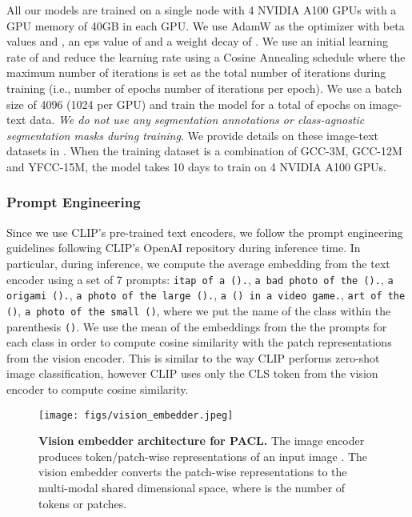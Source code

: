 \documentclass[10pt,twocolumn,letterpaper]{article}
\begin{document}
All our models are trained on a single node with 4 NVIDIA A100 GPUs with a GPU memory of 40GB in each GPU. We use AdamW as the optimizer with beta values  and , an eps value of  and a weight decay of . We use an initial learning rate of  and reduce the learning rate using a Cosine Annealing schedule where the maximum number of iterations is set as the total number of iterations during training (i.e., number of epochs  number of iterations per epoch). We use a batch size of 4096 (1024 per GPU) and train the model for a total of  epochs on image-text data. \emph{We do not use any segmentation annotations or class-agnostic segmentation masks during training}. We provide details on these image-text datasets in . When the training dataset is a combination of GCC-3M, GCC-12M and YFCC-15M, the model takes 10 days to train on 4 NVIDIA A100 GPUs.

\subsubsection{Prompt Engineering}
\label{app:prompt_engg}

Since we use CLIP's \cite{radford2021learning} pre-trained text encoders, we follow the prompt engineering guidelines following CLIP's OpenAI repository during inference time. In particular, during inference, we compute the average embedding from the text encoder using a set of 7 prompts: \texttt{itap of a ().}, \texttt{a bad photo of the ().}, \texttt{a origami ().}, \texttt{a photo of the large ().}, \texttt{a () in a video game.}, \texttt{art of the ()}, \texttt{a photo of the small ()}, where we put the name of the class within the parenthesis \texttt{()}. We use the mean of the embeddings from the the prompts for each class in order to compute cosine similarity with the patch representations from the vision encoder. This is similar to the way CLIP performs zero-shot image classification, however CLIP uses only the CLS token from the vision encoder to compute cosine similarity.

\begin{figure}[!t]
\centering
    \texttt{[image: figs/vision\_embedder.jpeg]}
    \caption{\textbf{Vision embedder  architecture for PACL.} The image encoder  produces token/patch-wise representations  of an input image . The vision embedder  converts the patch-wise representations to the multi-modal shared dimensional space,  where  is the number of tokens or patches.}
    \vspace{-4mm}
    \label{fig:pacl_vision_embedder}
\end{figure}
\end{document}
